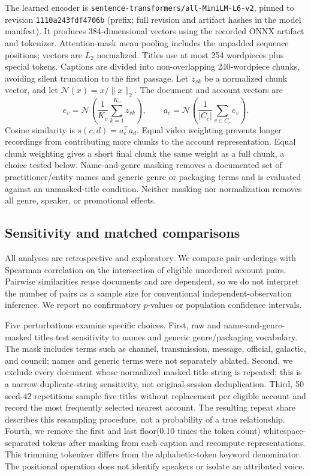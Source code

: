 The learned encoder is \texttt{sentence-transformers/all-MiniLM-L6-v2}, pinned to revision \texttt{1110a243fdf4706b} (prefix; full revision and artifact hashes in the model manifest). It produces 384-dimensional vectors using the recorded ONNX artifact and tokenizer. Attention-mask mean pooling includes the unpadded sequence positions; vectors are $L_2$ normalized. Titles use at most 254 wordpieces plus special tokens. Captions are divided into non-overlapping 240-wordpiece chunks, avoiding silent truncation to the first passage. Let $z_{vk}$ be a normalized chunk vector, and let $\mathcal{N}(x)=x/\|x\|_2$. The document and account vectors are
\begin{equation}
 e_v=\mathcal{N}\!\left(\frac{1}{K_v}\sum_{k=1}^{K_v}z_{vk}\right),\qquad
 a_c=\mathcal{N}\!\left(\frac{1}{|C_c|}\sum_{v\in C_c}e_v\right).
\end{equation}
Cosine similarity is $s(c,d)=a_c^\top a_d$. Equal video weighting prevents longer recordings from contributing more chunks to the account representation. Equal chunk weighting gives a short final chunk the same weight as a full chunk, a choice tested below. Name-and-genre masking removes a documented set of practitioner/entity names and generic genre or packaging terms and is evaluated against an unmasked-title condition. Neither masking nor normalization removes all genre, speaker, or promotional effects.

\subsection{Sensitivity and matched comparisons}
All analyses are retrospective and exploratory. We compare pair orderings with Spearman correlation on the intersection of eligible unordered account pairs. Pairwise similarities reuse documents and are dependent, so we do not interpret the number of pairs as a sample size for conventional independent-observation inference. We report no confirmatory $p$-values or population confidence intervals.

Five perturbations examine specific choices. First, raw and name-and-genre-masked titles test sensitivity to names and generic genre/packaging vocabulary. The mask includes terms such as channel, transmission, message, official, galactic, and council; names and generic terms were not separately ablated. Second, we exclude every document whose normalized masked title string is repeated; this is a narrow duplicate-string sensitivity, not original-session deduplication. Third, 50 seed-42 repetitions sample five titles without replacement per eligible account and record the most frequently selected nearest account. The resulting repeat share describes this resampling procedure, not a probability of a true relationship. Fourth, we remove the first and last floor(0.10 times the token count) whitespace-separated tokens after masking from each caption and recompute representations. This trimming tokenizer differs from the alphabetic-token keyword denominator. The positional operation does not identify speakers or isolate an attributed voice.

